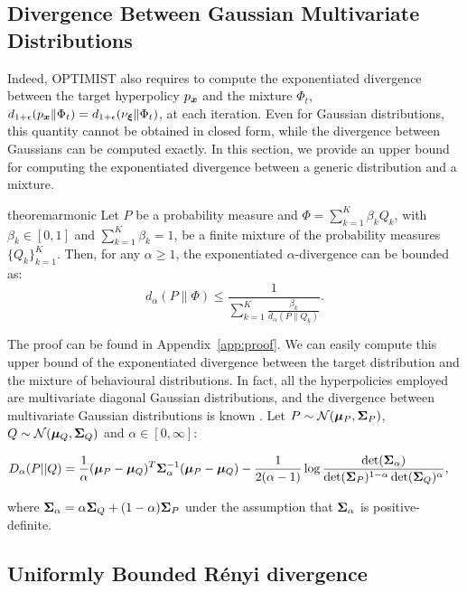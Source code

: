 \subsection{Divergence Between Gaussian Multivariate Distributions}

Indeed, \gls{OPTIMIST} also requires to compute the exponentiated \Renyi divergence between the target hyperpolicy $p_{\boldsymbol{x}}$ 
and the mixture $\Phi_t$, \ie $d_{1+\epsilon}(p_{\boldsymbol{x}}\|\Phi_t)=d_{1+\epsilon}(\nu_{\boldsymbol{\xi}}\|\Phi_t)$, at each iteration. Even for Gaussian distributions, this quantity cannot be obtained in closed form, while
the \Renyi divergence between Gaussians can be computed exactly. In this section, we provide an upper bound for computing the exponentiated \Renyi divergence
between a generic distribution and a mixture.
\begin{restatable}{theorem}{armonic}\label{th:armonic}
	Let $P$ be a probability measure and $\Phi = \sum_{k=1}^K \beta_k Q_k$, with $\beta_k \in [0,1]$ and $\sum_{k=1}^K \beta_k =1$, be a finite mixture of the
	probability measures $\{Q_k\}_{k=1}^K$. Then, for any $\alpha \ge 1$, the exponentiated $\alpha$-\Renyi divergence can be bounded as: 
	\begin{equation}
	d_{\alpha}(P \| \Phi) \le \frac{1} {\sum_{k=1}^K \frac{ \beta_k}{ d_{\alpha}(P \| Q_k)}}.
	\end{equation}
\end{restatable}

The proof can be found in Appendix~\ref{app:proof}. We can easily compute this upper bound of the exponentiated \Renyi divergence between the target distribution and the mixture of behavioural distributions. In fact, all the hyperpolicies employed are multivariate diagonal Gaussian distributions, and the \Renyi divergence between multivariate Gaussian distributions is known \cite{gil2013renyi}. Let $P\sim\mathcal{N}(\boldsymbol{\mu}_P,\boldsymbol{\Sigma}_P)$, $Q\sim\mathcal{N}(\boldsymbol{\mu}_Q,\boldsymbol{\Sigma}_Q)$ and $\alpha\in[0,\infty]$:

\begin{align} \label{eq:gaussianrenyi}
D_{\alpha}(P||Q) &= \frac{1}{\alpha}(\boldsymbol{\mu}_P-\boldsymbol{\mu}_Q)^T\boldsymbol{\Sigma}_\alpha^{-1}(\boldsymbol{\mu}_P-\boldsymbol{\mu}_Q)-\frac{1}{2(\alpha-1)}\log\frac{\det(\boldsymbol{\Sigma}_{\alpha})}{\det(\boldsymbol{\Sigma}_P)^{1-\alpha}\det(\boldsymbol{\Sigma}_Q)^{\alpha}},
\end{align}

where $\boldsymbol{\Sigma}_{\alpha}=\alpha\boldsymbol{\Sigma}_Q+(1-\alpha)\boldsymbol{\Sigma}_P$ under the assumption that $\boldsymbol{\Sigma}_{\alpha}$ is positive-definite.

\subsection{Uniformly Bounded Rényi divergence} \label{subsec:boundrenyi}

